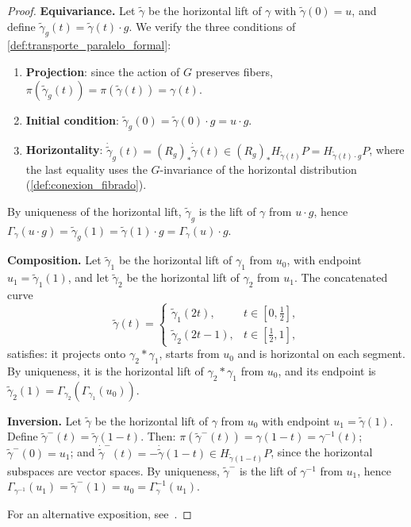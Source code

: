\begin{proof}
\textbf{Equivariance.} Let $\tilde{\gamma}$ be the horizontal lift of $\gamma$ with $\tilde{\gamma}(0) = u$, and define $\tilde{\gamma}_g(t) = \tilde{\gamma}(t) \cdot g$. We verify the three conditions of \autoref{def:transporte_paralelo_formal}:
\begin{enumerate}
    \item \textbf{Projection}: since the action of $G$ preserves fibers, $\pi(\tilde{\gamma}_g(t)) = \pi(\tilde{\gamma}(t)) = \gamma(t)$.
    \item \textbf{Initial condition}: $\tilde{\gamma}_g(0) = \tilde{\gamma}(0) \cdot g = u \cdot g$.
    \item \textbf{Horizontality}: $\dot{\tilde{\gamma}}_g(t) = (R_g)_* \dot{\tilde{\gamma}}(t) \in (R_g)_* H_{\tilde{\gamma}(t)} P = H_{\tilde{\gamma}(t) \cdot g} P$, where the last equality uses the $G$-invariance of the horizontal distribution (\autoref{def:conexion_fibrado}).
\end{enumerate}
By uniqueness of the horizontal lift, $\tilde{\gamma}_g$ is the lift of $\gamma$ from $u \cdot g$, hence $\Gamma_\gamma(u \cdot g) = \tilde{\gamma}_g(1) = \tilde{\gamma}(1) \cdot g = \Gamma_\gamma(u) \cdot g$.

\textbf{Composition.} Let $\tilde{\gamma}_1$ be the horizontal lift of $\gamma_1$ from $u_0$, with endpoint $u_1 = \tilde{\gamma}_1(1)$, and let $\tilde{\gamma}_2$ be the horizontal lift of $\gamma_2$ from $u_1$. The concatenated curve
\[
\tilde{\gamma}(t) = \begin{cases} \tilde{\gamma}_1(2t), & t \in [0, \tfrac{1}{2}], \\ \tilde{\gamma}_2(2t - 1), & t \in [\tfrac{1}{2}, 1], \end{cases}
\]
satisfies: it projects onto $\gamma_2 * \gamma_1$, starts from $u_0$ and is horizontal on each segment. By uniqueness, it is the horizontal lift of $\gamma_2 * \gamma_1$ from $u_0$, and its endpoint is $\tilde{\gamma}_2(1) = \Gamma_{\gamma_2}(\Gamma_{\gamma_1}(u_0))$.

\textbf{Inversion.} Let $\tilde{\gamma}$ be the horizontal lift of $\gamma$ from $u_0$ with endpoint $u_1 = \tilde{\gamma}(1)$. Define $\tilde{\gamma}^{-}(t) = \tilde{\gamma}(1-t)$. Then: $\pi(\tilde{\gamma}^{-}(t)) = \gamma(1-t) = \gamma^{-1}(t)$; $\tilde{\gamma}^{-}(0) = u_1$; and $\dot{\tilde{\gamma}}^{-}(t) = -\dot{\tilde{\gamma}}(1-t) \in H_{\tilde{\gamma}(1-t)}P$, since the horizontal subspaces are vector spaces. By uniqueness, $\tilde{\gamma}^{-}$ is the lift of $\gamma^{-1}$ from $u_1$, hence $\Gamma_{\gamma^{-1}}(u_1) = \tilde{\gamma}^{-}(1) = u_0 = \Gamma_\gamma^{-1}(u_1)$.

For an alternative exposition, see~\citep[Ch.~II, Prop.~3.2]{Kobayashi1996}.
\end{proof}

